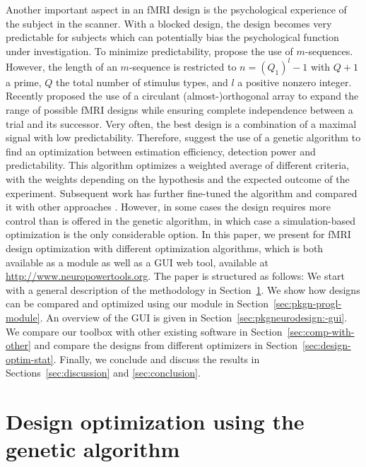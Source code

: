 \documentclass[article]{jss}
\begin{document}
Another important aspect in an fMRI design is the psychological
experience of the subject in the scanner. With a blocked design, the
design becomes very predictable for subjects which can potentially
bias the psychological function under investigation.  To minimize
predictability, \citet{Buracas2002-sg} propose the use of $m$-sequences.
However, the length of an $m$-sequence is restricted to $n=(Q_1)^l -1$ with
$Q+1$ a prime, $Q$ the total number of stimulus types, and $l$ a
positive nonzero integer.  Recently \citet{Lin2007} proposed the use
of a circulant (almost-)orthogonal array to expand the range of
possible fMRI designs while ensuring complete independence between a
trial and its successor.  Very often, the best design is a combination
of a maximal signal with low predictability.  Therefore,
\citet{Wager2003-hy} suggest the use of a genetic algorithm to find an
optimization between estimation efficiency, detection power and
predictability.  This algorithm optimizes a weighted average of
different criteria, with the weights depending on the hypothesis and
the expected outcome of the experiment.  Subsequent work has further
fine-tuned the algorithm and compared it with other approaches
\citep{Kao2009-yo}.  However, in some cases the design requires more
control than is offered in the genetic algorithm, in which case a
simulation-based optimization is the only considerable option.  In
this paper, we present  for fMRI design optimization
with different optimization algorithms, which is both available as a
 \citep{python} module as well as a GUI web tool, available at
\url{http://www.neuropowertools.org}.  The paper is structured as
follows: We start with a general description of the methodology in
Section~\ref{sec:design-optim-using}.  We show how designs can be
compared and optimized using our  module in
Section~\ref{sec:pkgn-progl-module}.  An overview of the GUI is given
in Section~\ref{sec:pkgneurodesign:-gui}.  We compare our toolbox with
other existing software in Section~\ref{sec:comp-with-other} and
compare the designs from different optimizers in
Section~\ref{sec:design-optim-stat}.  Finally, we conclude and discuss
the results in Sections~\ref{sec:discussion} and \ref{sec:conclusion}.

\section{Design optimization using the genetic algorithm}\label{sec:design-optim-using}
\end{document}
